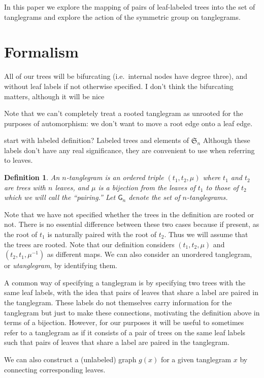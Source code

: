 \documentclass{amsart}
\newtheorem{definition}[theorem]{Definition}
\newcommand{\fS}{\mathfrak S}
\newcommand{\pairing}{\mu}
\newcommand{\tangle}{\mathsf{G}}
\begin{document}
In this paper we explore the mapping of pairs of leaf-labeled trees into the set of tanglegrams and explore the action of the symmetric group on tanglegrams.


\section{Formalism}
All of our trees will be bifurcating (i.e.\ internal nodes have degree three), and without leaf labels if not otherwise specified.
I don't think the bifurcating matters, although it will be nice

Note that we can't completely treat a rooted tanglegram as unrooted for the purposes of automorphism: we don't want to move a root edge onto a leaf edge.

start with labeled definition?
Labeled trees and elements of $\fS_n$
Although these labels don't have any real significance, they are convenient to use when referring to leaves.

\begin{definition}
\label{def:tanglegram}
An $n$-\emph{tanglegram} is an ordered triple $(t_1, t_2, \pairing)$ where $t_1$ and $t_2$ are trees with $n$ leaves, and $\pairing$ is a bijection from the leaves of $t_1$ to those of $t_2$ which we will call the ``pairing.''
Let $\tangle_n$ denote the set of $n$-tanglegrams.
\end{definition}
Note that we have not specified whether the trees in the definition are rooted or not.
There is no essential difference between these two cases because if present, as the root of $t_1$ is naturally paired with the root of $t_2$.
Thus we will assume that the trees are rooted.
Note that our definition considers $(t_1, t_2, \pairing)$ and $(t_2, t_1, \pairing^{-1})$ as different maps.
We can also consider an unordered tanglegram, or \emph{utanglegram}, by identifying them.

A common way of specifying a tanglegram is by specifying two trees with the same leaf labels, with the idea that pairs of leaves that share a label are paired in the tanglegram.
These labels do not themselves carry information for the tanglegram but just to make these connections, motivating the definition above in terms of a bijection.
However, for our purposes it will be useful to sometimes refer to a tanglegram as if it consists of a pair of trees on the same leaf labels such that pairs of leaves that share a label are paired in the tanglegram.

We can also construct a (unlabeled) graph $g(x)$ for a given tanglegram $x$ by connecting corresponding leaves.
\end{document}
